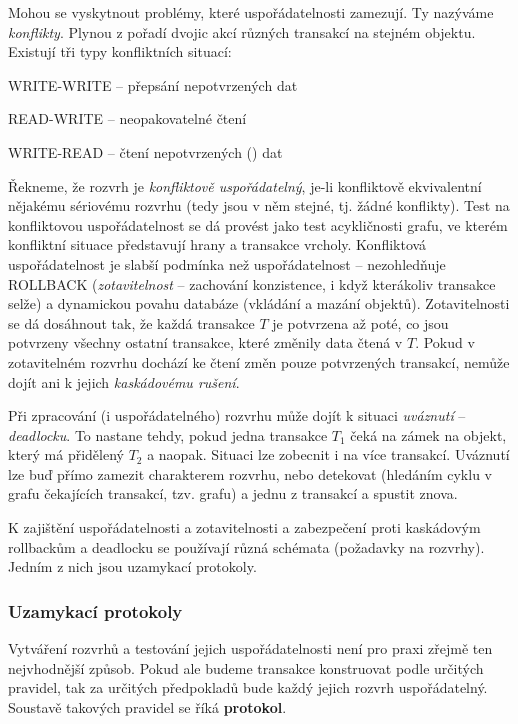 Mohou se vyskytnout problémy, které uspořádatelnosti zamezují. Ty nazýváme \emph{konflikty}. Plynou z pořadí dvojic akcí různých transakcí na stejném objektu. Existují tři typy konfliktních situací:
\begin{penumerate}
    \item WRITE-WRITE -- přepsání nepotvrzených dat
    \item READ-WRITE -- neopakovatelné čtení
    \item WRITE-READ -- čtení nepotvrzených () dat
\end{penumerate}

Řekneme, že rozvrh je \emph{konfliktově uspořádatelný}, je-li konfliktově ekvivalentní nějakému sériovému rozvrhu (tedy jsou v něm stejné, tj. žádné konflikty). Test na konfliktovou uspořádatelnost se dá provést jako test acykličnosti grafu, ve kterém konfliktní situace představují hrany a transakce vrcholy. Konfliktová uspořádatelnost je slabší podmínka než uspořádatelnost -- nezohledňuje ROLLBACK (\emph{zotavitelnost} -- zachování konzistence, i když kterákoliv transakce selže) a dynamickou povahu databáze (vkládání a mazání objektů). Zotavitelnosti se dá dosáhnout tak, že každá transakce $T$ je potvrzena až poté, co jsou potvrzeny všechny ostatní transakce, které změnily data čtená v $T$. Pokud v zotavitelném rozvrhu dochází ke čtení změn pouze potvrzených transakcí, nemůže dojít ani k jejich \emph{kaskádovému rušení}.

Při zpracování (i uspořádatelného) rozvrhu může dojít k situaci \emph{uváznutí} -- \emph{deadlocku}. To nastane tehdy, pokud jedna transakce $T_1$ čeká na zámek na objekt, který má přidělený $T_2$ a naopak. Situaci lze zobecnit i na více transakcí. Uváznutí lze buď přímo zamezit charakterem rozvrhu, nebo detekovat (hledáním cyklu v grafu čekajících transakcí, tzv.  grafu) a jednu z transakcí  a spustit znova.

\medskip
K zajištění uspořádatelnosti a zotavitelnosti a zabezpečení proti kaskádovým rollbackům a deadlocku se používají různá schémata (požadavky na rozvrhy). Jedním z nich jsou uzamykací protokoly.

\subsubsection*{Uzamykací protokoly}

Vytváření rozvrhů a testování jejich uspořádatelnosti není pro praxi zřejmě ten
nejvhodnější způsob. Pokud ale budeme transakce konstruovat podle určitých
pravidel, tak za určitých předpokladů bude každý jejich rozvrh uspořádatelný.
Soustavě takových pravidel se říká \textbf{protokol}.

